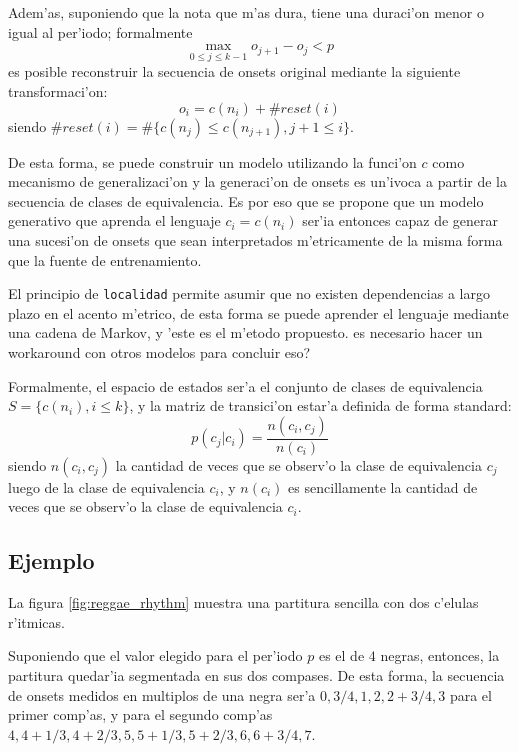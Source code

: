 Adem'as, suponiendo que la nota que m'as dura, tiene una duraci'on menor o igual al per'iodo; formalmente $$\max_{0\leq j \leq k-1}o_{j+1}-o_j < p$$ es posible reconstruir 
la secuencia de onsets original mediante la siguiente transformaci'on:
$$o_i=c(n_i) + \#reset(i)$$ siendo $\#reset(i)=\#\{c(n_j) \leq c(n_{j+1}), j+1 \leq i\}$.

De esta forma, se puede construir un modelo utilizando la funci'on $c$ como mecanismo de generalizaci'on y la generaci'on de onsets es un'ivoca a partir de la secuencia de 
clases de equivalencia. Es por eso que se propone que un modelo generativo que aprenda el lenguaje $c_i=c(n_i)$ ser'ia entonces capaz de generar una sucesi'on de onsets 
que sean interpretados m'etricamente de la misma forma que la fuente de entrenamiento. 


El principio de \texttt{localidad} permite asumir que no existen dependencias a largo plazo en el acento m'etrico, de esta forma se puede aprender el lenguaje mediante
una cadena de Markov, y 'este es el m'etodo propuesto. \alert{es necesario hacer un workaround con otros modelos para concluir eso?}

Formalmente, el espacio de estados ser'a el conjunto de clases de equivalencia $S=\{c(n_i), i\leq k \}$, y la matriz de transici'on estar'a definida de forma standard:
$$p(c_j|c_i) = \frac{n(c_i, c_j)}{n(c_i)}$$
siendo $n(c_i, c_j)$ la cantidad de veces que se observ'o la clase de equivalencia $c_j$ luego de la clase de equivalencia $c_i$, y $n(c_i)$ es sencillamente la cantidad de 
veces que se observ'o la clase de equivalencia $c_i$.

\subsection{Ejemplo}
La figura \ref{fig:reggae_rhythm} muestra una partitura sencilla con dos c'elulas r'itmicas.


\begin{imagen}
    \width{15cm}
\end{imagen}

Suponiendo que el valor elegido para el per'iodo $p$ es el de $4$ negras, entonces, la partitura quedar'ia segmentada en sus dos compases. 
De esta forma, la secuencia de onsets medidos en multiplos de una negra ser'a $0, 3/4, 1, 2, 2+3/4, 3$ para el primer comp'as, 
y para el segundo comp'as $4, 4+1/3, 4+2/3, 5, 5+1/3, 5+2/3, 6, 6+3/4, 7$.

